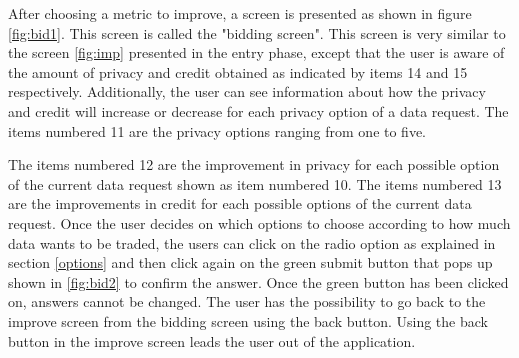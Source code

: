 After choosing a metric to improve, a screen is presented as shown in figure \ref{fig:bid1}.
This screen is called the "bidding screen". This screen is very similar to the screen \ref{fig:imp} presented in the entry phase, except that the user
is aware of the amount of privacy and credit obtained as indicated by items 14 and 15 respectively. Additionally, the user can see information about how the privacy and credit will increase or decrease for each privacy option of a data request. The items numbered 11 are the privacy options ranging from one to five.

The items numbered 12 are the improvement in privacy for each possible option of the current data request shown as item numbered 10. The items numbered 13 are the improvements in credit for each possible options of the current data request. Once the user decides on which options to choose according to how much data wants to be traded, the users can click on the radio option as explained in section \ref{options} and then click again on the green submit button that pops up shown in \ref{fig:bid2} to confirm the answer. Once the green button has been clicked on, answers cannot be changed. The user has the possibility to go back to the improve screen from the bidding screen using the back button. Using the back button in the improve screen leads the user out of the application.

